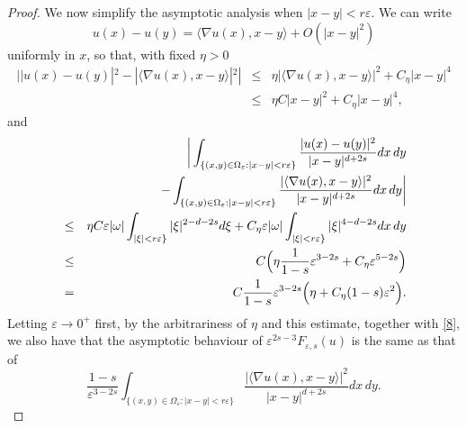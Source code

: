 \documentclass{article}
\newcommand{\e}{\varepsilon}
\begin{document}
\begin{proof}
We now simplify the asymptotic analysis when $|x-y|<r\e$. We can write
$$
u(x)-u(y)= \langle \nabla u(x), x-y\rangle + O(|x-y|^2)
$$
uniformly in $x$, so that, with fixed $\eta>0$
\begin{eqnarray*}
||u(x)-u(y)|^2- |\langle \nabla u(x), x-y\rangle|^2|&\le& \eta|\langle \nabla u(x), x-y\rangle|^2 +C_\eta |x-y|^4\\
&\le& \eta C|x-y|^2 +C_\eta |x-y|^4,
\end{eqnarray*}
and
\begin{eqnarray}\label{a2}\nonumber
&&\hskip-1.5cm\bigg|\int_{\{(x,y)\in\Omega_\e: |x-y|<r\e\}}\frac{|u(x)-u(y)|^2}{|x-y|^{d+2s}} dx\,dy
\\ \nonumber
&& -\int_{\{(x,y)\in\Omega_\e: |x-y|<r\e\}}\frac{|\langle \nabla u(x), x-y\rangle|^2}{|x-y|^{d+2s}} dx\,dy\bigg|\\ \nonumber
&\le&  \eta C\e|\omega|\int_{|\xi|<r\e\}}{|\xi|^{2-d-2s}} d\xi+C_\eta \e|\omega|\int_{|\xi|<r\e\}}{|\xi|^{4-d-2s}} dx\,dy\\\nonumber
&\le&  C\Big( \eta \frac{1}{1-s}\e^{3-2s}+C_\eta \e^{5-2s}\Big)\\
&=&  C\frac{1}{1-s}\e^{3-2s}\Big(  \eta+ C_\eta (1-s)\e^2\Big).
\end{eqnarray}
Letting $\e\to 0^+$  first, by the arbitrariness of $\eta$ and this estimate, together with \eqref{8}, we also have that the asymptotic behaviour of ${\e^{2s-3}}F_{\e,s}(u)$ is the same as that
of
$$
\frac{1-s}{\e^{3-2s}} \int_{\{(x,y)\in\Omega_\e: |x-y|<r\e\}}\frac{|\langle \nabla u(x), x-y\rangle|^2}{|x-y|^{d+2s}} dx\,dy.
$$


\end{proof}
\end{document}
